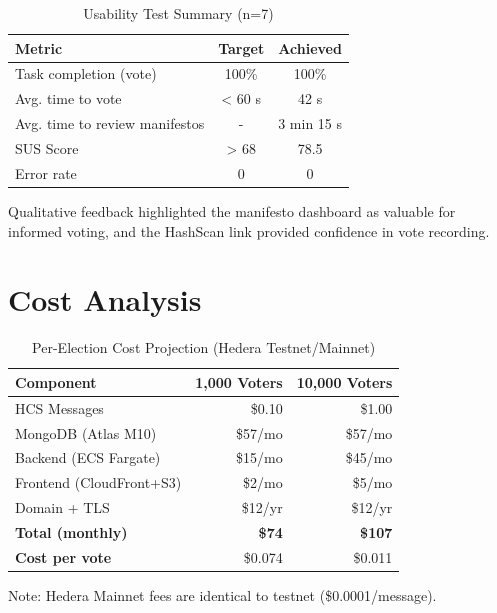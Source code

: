 \begin{table}[H]
\centering
\caption{Usability Test Summary (n=7)}
\label{tab:usability}
\begin{tabular}{@{}lcc@{}}
\toprule
\textbf{Metric} & \textbf{Target} & \textbf{Achieved} \\
\midrule
Task completion (vote) & 100\% & 100\% \\
Avg. time to vote & < 60 s & 42 s \\
Avg. time to review manifestos & - & 3 min 15 s \\
SUS Score & > 68 & 78.5 \\
Error rate & 0 & 0 \\
\midrule
\end{tabular}
\end{table}

Qualitative feedback highlighted the manifesto dashboard as valuable for informed voting,
and the HashScan link provided confidence in vote recording.

\section{Cost Analysis}
\label{sec:cost}

\begin{table}[H]
\centering
\caption{Per-Election Cost Projection (Hedera Testnet/Mainnet)}
\label{tab:cost}
\begin{tabular}{@{}lrr@{}}
\toprule
\textbf{Component} & \textbf{1,000 Voters} & \textbf{10,000 Voters} \\
\midrule
HCS Messages & \$0.10 & \$1.00 \\
MongoDB (Atlas M10) & \$57/mo & \$57/mo \\
Backend (ECS Fargate) & \$15/mo & \$45/mo \\
Frontend (CloudFront+S3) & \$2/mo & \$5/mo \\
Domain + TLS & \$12/yr & \$12/yr \\
\midrule
\textbf{Total (monthly)} & \textbf{\$74} & \textbf{\$107} \\
\textbf{Cost per vote} & \$0.074 & \$0.011 \\
\bottomrule
\end{tabular}
\end{table}

Note: Hedera Mainnet fees are identical to testnet (\$0.0001/message).